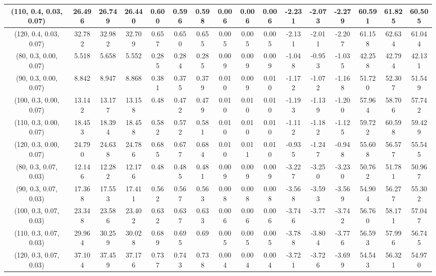 \documentclass[preprint,12pt,1p]{elsarticle}
\begin{document}
\begin{table}[!h]
\begin{center}
{\begin{tabular}{| c | c | c | c | c | c | c| c| c| c| c| c| c| c| c| c|}
(110, 0.4, 0.03, 0.07)&  26.496 & 26.749 & 26.440 & 0.600 & 0.596 & 0.598 & 0.006 & 0.006 & 0.006 & -2.231 & -2.073 & -2.279 & 60.591 & 61.825 & 60.505  \\ \hline    
(120, 0.4, 0.03, 0.07)&  32.782 & 32.982 & 32.709 & 0.657 & 0.650 & 0.655 & 0.005 & 0.005 & 0.005 & -2.131 & -2.011 & -2.207 & 61.158 & 62.634 & 61.044 \\ \hline   
(80, 0.3, 0.00, 0.07)&  5.518 & 5.658 & 5.552 & 0.285 & 0.284 & 0.285 & 0.009 & 0.009 & 0.009 & -1.048 & -0.953 & -1.035 & 42.258 & 42.794 & 42.131 \\ \hline    
(90, 0.3, 0.00, 0.07)&  8.842 & 8.947 & 8.868 & 0.381 & 0.375 & 0.379 & 0.010 & 0.009 & 0.010 & -1.172 & -1.072 & -1.168 & 51.720 & 52.307 & 51.549 \\ \hline    
(100, 0.3, 0.00, 0.07)&  13.142 & 13.177 & 13.158 & 0.48 & 0.472 & 0.479 & 0.010 & 0.010 & 0.010 & -1.193 & -1.139 & -1.200 & 57.964 & 58.706 & 57.742\\ \hline    
(110, 0.3, 0.00, 0.07)&  18.453 & 18.394 & 18.458 & 0.582 & 0.572 & 0.581 & 0.010 & 0.010 & 0.010 & -1.112 & -1.182 & -1.125 & 59.722 & 60.598 & 59.429 \\ \hline    
(120, 0.3, 0.00, 0.07)&  24.790 & 24.638 & 24.786 & 0.685 & 0.677 & 0.684 & 0.010 & 0.011 & 0.010 & -0.935 & -1.247 & -0.948 & 55.608 & 56.577 & 55.545 \\ \hline   
(80, 0.3, 0.07, 0.03)&  12.146 & 12.282 & 12.176 & 0.48 & 0.485 & 0.481 & 0.009 & 0.009 & 0.009 & -3.227 & -3.250 & -3.230 & 50.762 & 51.781 & 50.967 \\ \hline    
(90, 0.3, 0.07, 0.03)&  17.368 & 17.553 & 17.411 & 0.562 & 0.567 & 0.563 & 0.008 & 0.008 & 0.008 & -3.568 & -3.593 & -3.569 & 54.904 & 56.277 & 55.302  \\ \hline    
(100, 0.3, 0.07, 0.03)&  23.348 & 23.586 & 23.402 & 0.632 & 0.637 & 0.633 & 0.006 & 0.006 & 0.006 & -3.746 & -3.77 & -3.742 & 56.760 & 58.171 & 57.047 \\ \hline    
(110, 0.3, 0.07, 0.03)&  29.964 & 30.259 & 30.028 & 0.689 & 0.695 & 0.69 & 0.005 & 0.005 & 0.005 & -3.788 & -3.804 & -3.776 & 56.593 & 57.996 & 56.745 \\ \hline    
(120, 0.3, 0.07, 0.03)&  37.104 & 37.459 & 37.176 & 0.737 & 0.743 & 0.738 & 0.004 & 0.004 & 0.004 & -3.721 & -3.726 & -3.699 & 54.543 & 56.321 & 54.970  \\ \hline     
\end{tabular}}
\end{center}
\end{table}
\end{document}
